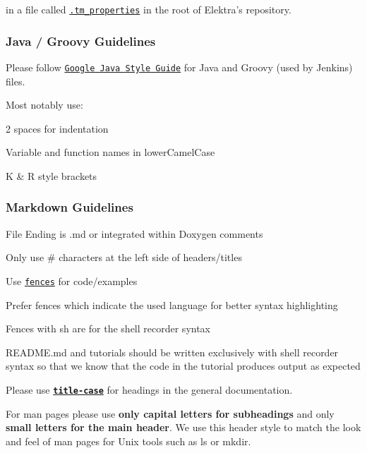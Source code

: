 in a file called \href{https://macromates.com/blog/2011/git-style-configuration}{\tt {\ttfamily .tm\+\_\+properties}} in the root of Elektra’s repository.

\subsubsection*{Java / Groovy Guidelines}

Please follow \href{https://google.github.io/styleguide/javaguide.html}{\tt Google Java Style Guide} for Java and Groovy (used by Jenkins) files.

Most notably use\+:


\begin{DoxyItemize}
\item 2 spaces for indentation
\item Variable and function names in lower\+Camel\+Case
\item K \& R style brackets
\end{DoxyItemize}

\subsubsection*{Markdown Guidelines}


\begin{DoxyItemize}
\item File Ending is {\ttfamily .md} or integrated within Doxygen comments
\item Only use {\ttfamily \#} characters at the left side of headers/titles
\item Use \href{https://help.github.com/en/articles/creating-and-highlighting-code-blocks}{\tt fences} for code/examples
\item Prefer fences which indicate the used language for better syntax highlighting
\item Fences with sh are for the shell recorder syntax
\item {\ttfamily R\+E\+A\+D\+M\+E.\+md} and tutorials should be written exclusively with shell recorder syntax so that we know that the code in the tutorial produces output as expected
\item Please use \href{https://en.wiktionary.org/wiki/title_case}{\tt {\bfseries title-\/case}} for headings in the general documentation.
\item For man pages please use {\bfseries only capital letters for subheadings} and only {\bfseries small letters for the main header}. We use this header style to match the look and feel of man pages for Unix tools such as {\ttfamily ls} or {\ttfamily mkdir}.
\end{DoxyItemize}

